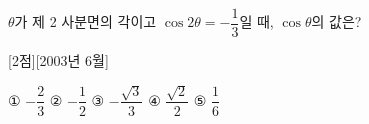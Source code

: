  $\theta 
$가 제 2 사분면의 각이고 $\cos 2\theta = -\dfrac{1}{3}
$일 때, $\cos\theta 
$의 값은? 

[2점][2003년 6월]

① $-\dfrac{2}{3}
$ ② $-\dfrac{1}{2}
$  ③ $-\dfrac{\sqrt{3}}{3}
$ ④ $\dfrac{\sqrt{2}}{2}
$  ⑤ $\dfrac{1}{6}
$
\vfill{}
\rule{0pt}{1mm}